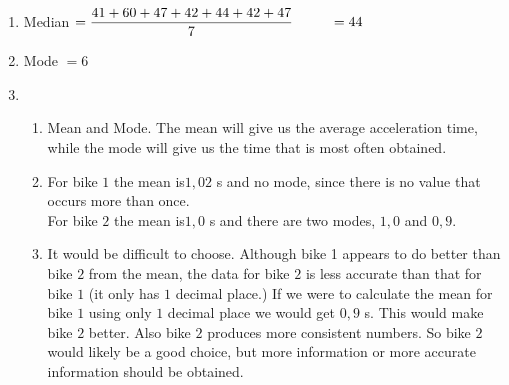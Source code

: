  \begin{eocsolutions}{}{
\begin{enumerate}[itemsep=5pt, label=\textbf{\arabic*}. ] 


\item %
Median $=\dfrac{41+60+47+42+44+42+47}{7} \\
~~~~~~~~=44\\$
\item %
Mode $=6$
\item %

\begin{enumerate}[noitemsep, label=\textbf{(\alph*)} ]
    \item Mean and Mode. The mean will give us the average acceleration time, while the mode will give us the time that is most often obtained.%
    \item For bike $1$ the mean is$1,02$ s and no mode, since there is no value that occurs more than once.\\
	  For bike $2$ the mean is$1,0$ s and there are two modes, $1,0$ and $0,9$.
    \item It would be difficult to choose. Although bike 1 appears to do better than bike $2$ from the mean, the data for bike $2$ is less accurate than that for bike $1$ (it only has $1$ decimal place.) If we were to calculate the mean for bike $1$ using only $1$ decimal place we would get $0,9$ s. This would make bike $2$ better. Also bike $2$ produces more consistent numbers. So bike $2$ would likely be a good choice, but more information or more accurate information should be obtained.

    \end{enumerate}


\end{enumerate}}
\end{eocsolutions}
